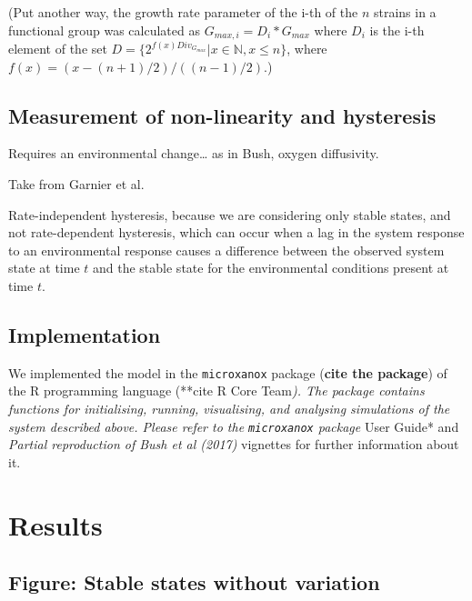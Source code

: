 \documentclass{article}
\begin{document}
(Put another way, the growth rate parameter of the i-th of the \(n\)
strains in a functional group was calculated as
\(G_{max, i} = D_i * G_{max}\) where \(D_i\) is the i-th element of the
set \(D = \{2^{f(x)Div_{G_{max}}} | x \in \mathbb{N}, x \leq n\}\),
where \(f(x) = (x-(n+1)/2) / (( n-1)/2)\).)

\hypertarget{measurement-of-non-linearity-and-hysteresis}{%
\subsection{Measurement of non-linearity and
hysteresis}\label{measurement-of-non-linearity-and-hysteresis}}

Requires an environmental change\ldots{} as in Bush, oxygen diffusivity.

Take from Garnier et al.

Rate-independent hysteresis, because we are considering only stable
states, and not rate-dependent hysteresis, which can occur when a lag in
the system response to an environmental response causes a difference
between the observed system state at time \(t\) and the stable state for
the environmental conditions present at time \(t\).

\hypertarget{implementation}{%
\subsection{Implementation}\label{implementation}}

We implemented the model in the \texttt{microxanox} package
(\textbf{cite the package}) of the R programming language (**cite R Core
Team\emph{). The package contains functions for initialising, running,
visualising, and analysing simulations of the system described above.
Please refer to the \texttt{microxanox} package} User Guide* and
\emph{Partial reproduction of Bush et al (2017)} vignettes for further
information about it.

\hypertarget{results}{%
\section{Results}\label{results}}

\hypertarget{figure-stable-states-without-variation}{%
\subsection{Figure: Stable states without
variation}\label{figure-stable-states-without-variation}}
\end{document}
